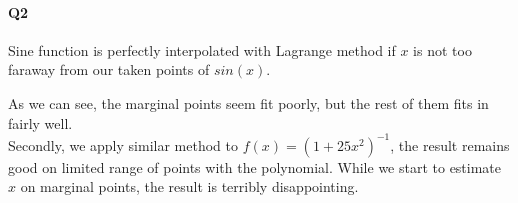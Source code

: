 \documentclass[11pt]{article}
\begin{document}
\paragraph{Q2}
Sine function is perfectly interpolated with Lagrange method if $x$ is not too faraway from our taken points of $sin(x)$.
\begin{figure}[H]
	\centering
\end{figure}
As we can see, the marginal points seem fit poorly, but the rest of them fits in fairly well.\\
\hspace*{0.4cm}
Secondly, we apply similar method to $f(x)=(1+25x^2)^{-1}$, the result remains good on limited range of points with the polynomial. While we start to estimate $x$ on marginal points, the result is terribly disappointing.
\end{document}
